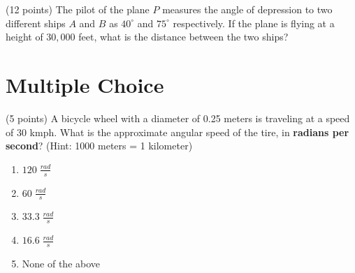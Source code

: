 \documentclass[fleqn]{article}
\renewcommand{\thispagestyle}[1]{}
\begin{document}
\begin{enumerate}
\begin{minipage}{0.6\textwidth}
\item
(12 points) The pilot of the plane $P$ measures the angle of depression to two different ships $A$ and $B$ as $40^\circ$ and $75^\circ$ respectively.
If the plane is flying at a height of $30,000$ feet, what is the distance between the two ships?

\end{minipage} \hspace{0.05\textwidth}
\begin{minipage}{0.2\textwidth}
\end{minipage}

\vspace{2 in}

\pagebreak
\thispagestyle{fancy}{
\lhead{}
}

\section*{Multiple Choice}

\item 
(5 points) A bicycle wheel with a diameter of 0.25 meters is traveling at a speed of 30 kmph.
What is the approximate angular speed of the tire, in \textbf{radians per second}? (Hint: 1000 meters = 1 kilometer)

\begin{enumerate}
\item $120 \; \frac{rad}{s}$

\item $60 \; \frac{rad}{s}$

\item $33.3 \; \frac{rad}{s}$

\item $16.6 \; \frac{rad}{s}$

\item None of the above


\end{enumerate}
\end{enumerate}
\end{document}

